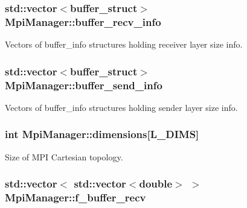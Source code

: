 \subsubsection[{\texorpdfstring{buffer\+\_\+recv\+\_\+info}{buffer_recv_info}}]{\setlength{\rightskip}{0pt plus 5cm}std\+::vector$<${\bf buffer\+\_\+struct}$>$ Mpi\+Manager\+::buffer\+\_\+recv\+\_\+info}\hypertarget{class_mpi_manager_a5e769fa077d24d62d10a9a0d303009d1}{}\label{class_mpi_manager_a5e769fa077d24d62d10a9a0d303009d1}


Vectors of buffer\+\_\+info structures holding receiver layer size info. 

\subsubsection[{\texorpdfstring{buffer\+\_\+send\+\_\+info}{buffer_send_info}}]{\setlength{\rightskip}{0pt plus 5cm}std\+::vector$<${\bf buffer\+\_\+struct}$>$ Mpi\+Manager\+::buffer\+\_\+send\+\_\+info}\hypertarget{class_mpi_manager_a3a91c2e8cfb15027a0681c198f82d257}{}\label{class_mpi_manager_a3a91c2e8cfb15027a0681c198f82d257}


Vectors of buffer\+\_\+info structures holding sender layer size info. 

\subsubsection[{\texorpdfstring{dimensions}{dimensions}}]{\setlength{\rightskip}{0pt plus 5cm}int Mpi\+Manager\+::dimensions\mbox{[}{\bf L\+\_\+\+D\+I\+MS}\mbox{]}}\hypertarget{class_mpi_manager_a8d486f77671328cdc139f6cef2a4006f}{}\label{class_mpi_manager_a8d486f77671328cdc139f6cef2a4006f}


Size of M\+PI Cartesian topology. 

\subsubsection[{\texorpdfstring{f\+\_\+buffer\+\_\+recv}{f_buffer_recv}}]{\setlength{\rightskip}{0pt plus 5cm}std\+::vector$<$ std\+::vector$<$double$>$ $>$ Mpi\+Manager\+::f\+\_\+buffer\+\_\+recv}\hypertarget{class_mpi_manager_ab8f1eeab50fd4812b3a51af1a6c43713}{}\label{class_mpi_manager_ab8f1eeab50fd4812b3a51af1a6c43713}


